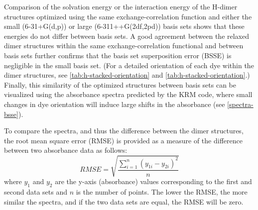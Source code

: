 Comparison of the solvation energy or the interaction energy of the H-dimer structures optimized using the same exchange-correlation function and either the small (6-31+G(d,p)) or large (6-311++G(2df,2pd)) basis sets shows that these energies do not differ between basis sets. A good agreement between the relaxed dimer structures within the same exchange-correlation functional and between basis sets further confirms that the basis set superposition error (BSSE) is negligible in the small basis set. (For a detailed orientation of each dye within the dimer structures, see \autoref{tab:h-stacked-orientation} and \autoref{tab:h-stacked-orientation}.) Finally, this similarity of the optimized structures between basis sets can be visualized using the absorbance spectra predicted by the KRM code, where small changes in dye orientation will induce large shifts in the absorbance (see \autoref{spectra-bsse}). 

To compare the spectra, and thus the difference between the dimer structures, the root mean square error (RMSE) is provided as a measure of the difference between two absorbance data as follows:
\begin{equation}\label{rmse}
    RMSE= \sqrt{\frac{\sum_{i=1}^n (y_{1i}-y_{2i})^2}{n}}
\end{equation}
where $y_{1}$ and $y_{2}$ are the y-axis (absorbance) values corresponding to the first and second data sets and $n$ is the number of points. The lower the RMSE, the more similar the spectra, and if the two data sets are equal, the RMSE will be zero. 

